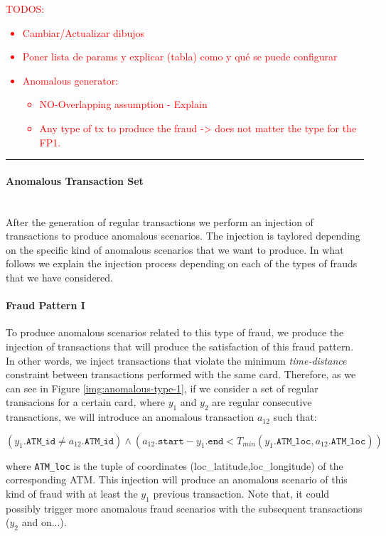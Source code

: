 \textcolor{red}{TODOS:
\begin{itemize}
\item Cambiar/Actualizar dibujos
\item Poner lista de params y explicar (tabla) como y qué se puede configurar
\item Anomalous generator:
\begin{itemize}
  \item NO-Overlapping assumption - Explain
  \item Any type of tx to produce the fraud -> does not matter the type for the FP1.
\end{itemize}
\end{itemize}
}
\textcolor{red}{\rule{\linewidth}{0.5mm}}

\paragraph{Anomalous Transaction Set\\\\}

After the generation of regular transactions we perform an injection of transactions to produce anomalous scenarios. The injection is taylored depending on the specific kind of 
anomalous scenarios that we want to produce. In what follows we explain the injection process depending on each of the types of frauds that we have considered.

\paragraph{Fraud Pattern I}

To produce anomalous scenarios related to this type of fraud, we produce the injection
of transactions that will produce the satisfaction of this fraud pattern. In other words,
we inject transactions that violate the minimum \emph{time-distance} constraint between transactions performed with the same card. Therefore, as we can see in Figure \ref{img:anomalous-type-1}, if we consider a set of regular transacions for a certain card, where $y_1$ and $y_2$ are regular consecutive transactions, we will introduce an anomalous transaction $a_{12}$ such that: 

$$(y_1.\texttt{ATM\_id} \ne a_{12}.\texttt{ATM\_id}) \land (a_{12}.\texttt{start} - 
y_1.\texttt{end} < T_{min}(y_1.\texttt{ATM\_loc}, a_{12}.\texttt{ATM\_loc}))$$

where \texttt{ATM\_loc} is the tuple of coordinates (loc\_latitude,loc\_longitude) of the corresponding ATM. This injection will produce an anomalous scenario of this kind of fraud with at least the $y_1$ previous transaction. Note that, it could possibly trigger more anomalous fraud scenarios with the subsequent transactions ($y_2$ and on...).


